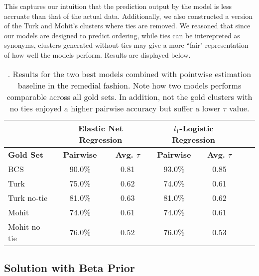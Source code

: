 This captures our intuition that the prediction output by the model is less accruate than that of the actual data. Additionally, we also constructed a version of the Turk and Mohit's clusters where ties are removed. We reasoned that since our models are designed to predict ordering, while ties can be interepreted as synonyms, clusters generated without ties may give a more ``fair" representation of how well the models perform. Results are displayed below. 

\begin{table}
\small
\centering
\begin{tabular}{|l|cc|cc|cc|}
	\hline 
	& \multicolumn{2}{c|}{Elastic Net Regression } 
	& \multicolumn{2}{c|}{$l_1$-Logistic Regression} \\
	\hline 
	\bf Gold Set
	& \bf Pairwise & \bf Avg. $\tau$  
	& \bf Pairwise & \bf Avg. $\tau$  \\ 
	\hline
	BCS          & 90.0\% & 0.81 & 93.0\%  &  0.85 \\
	Turk         & 75.0\% & 0.62 & 74.0\%  &  0.61 \\
	Turk no-tie  & 81.0\% & 0.63 & 81.0\%  &  0.62 \\
	Mohit        & 74.0\% & 0.61 & 74.0\%  &  0.61 \\
	Mohit no-tie & 76.0\% & 0.52 & 76.0\%  &  0.53 \\
	\hline
\end{tabular}
\caption{\label{font-table}. Results for the two best models combined with pointwise estimation baseline in the remedial fashion. Note how two models performs comparable across all gold sets. In addition, not the gold clusters with no ties enjoyed a higher pairwise accuracy but suffer a lower $\tau$ value. }
\end{table}

\subsection{Solution with Beta Prior}

